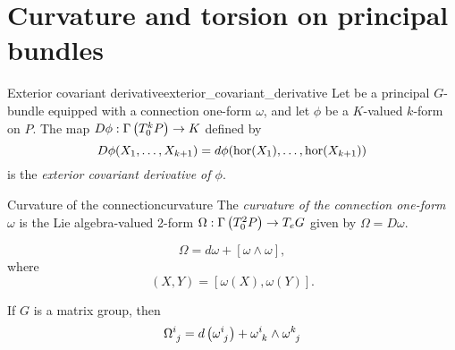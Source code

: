 \section{Curvature and torsion on principal bundles}

\begin{definition}{Exterior covariant derivative}{exterior_covariant_derivative}
    Let  be a principal \(G\)-bundle equipped with a connection one-form \(\omega\), and let \(\phi\) be a \(K\)-valued \(k\)-form on \(P\). The map \(D \phi : \Gamma\left(T_0^k P\right) \to K\) defined by
    \begin{equation*}
        D\phi(X_1, \dots, X_{k+1}) = d\phi(\operatorname{hor}(X_1), \dots, \operatorname{hor}(X_{k+1}))
    \end{equation*}
    is the \emph{exterior covariant derivative of \(\phi\)}.
\end{definition}

\begin{definition}{Curvature of the connection}{curvature}
    The \emph{curvature of the connection one-form \(\omega\)} is the Lie algebra-valued 2-form \(\Omega : \Gamma\left(T^2_0P\right) \to T_eG\) given by \(\Omega = D\omega.\)
\end{definition}

\begin{proposition}{}{}
    \begin{equation*}
        \Omega = d\omega + [\omega \wedge \omega],
    \end{equation*}
    where
    \begin{equation*}
        [\omega \wedge \omega](X,Y) = [\omega(X), \omega(Y)].
    \end{equation*}
\end{proposition}
\begin{remark}
    If \(G\) is a matrix group, then
    \begin{equation*}
        \Omega\indices{^i_j} = d\left(\omega\indices{^i_j}\right) + \omega\indices{^i_k}\wedge\omega\indices{^k_j}
    \end{equation*}
\end{remark}

